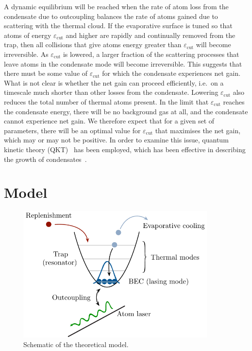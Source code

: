A dynamic equilibrium will be reached when the rate of atom loss from the condensate due to outcoupling balances the rate of atoms gained due to scattering with the thermal cloud.  If the evaporative surface is tuned so that atoms of energy $\varepsilon_\text{cut}$ and higher are rapidly and continually removed from the trap, then all collisions that give atoms energy greater than $\varepsilon_\text{cut}$ will become irreversible. As $\varepsilon_\text{cut}$ is lowered, a larger fraction of the scattering processes that leave atoms in the condensate mode will become irreversible. This suggests that there must be some value of $\varepsilon_\text{cut}$ for which the condensate experiences net gain. What is not clear is whether the net gain can proceed efficiently, i.e.\ on a timescale much shorter than other losses from the condensate.  Lowering $\varepsilon_\text{cut}$ also reduces the total number of thermal atoms present. In the limit that $\varepsilon_\text{cut}$ reaches the condensate energy, there will be no background gas at all, and the condensate cannot experience net gain.  We therefore expect that for a given set of parameters, there will be an optimal value for $\varepsilon_\text{cut}$ that maximises the net gain, which may or may not be positive. In order to examine this issue, quantum kinetic theory (QKT)~\citep{Gardiner:1997tz,Jaksch:1997ug,Gardiner:1998wx,Jaksch:1998sj,Gardiner:2000ug,Lee:2000vs,Davis:2000vn} has been employed, which has been effective in describing the growth of condensates~\citep{Davis:2000vn}.


\section{Model}
\label{KineticTheory:Model}

\begin{figure}
    \centering
        \includegraphics[width=10cm]{QKTModel2}
    \caption{Schematic of the theoretical model.}
    \label{KineticTheory:QKTModel}
\end{figure}

